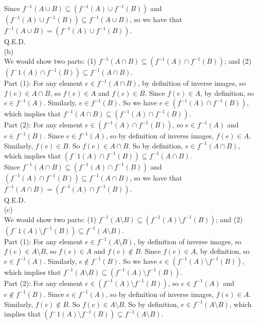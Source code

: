 \documentclass{article}
\begin{document}
\indent Since $f^{-1}(A\cup B)\subseteq(f^{-1}(A)\cup f^{-1}(B))$ and $(f^{-1}(A)\cup f^{-1}(B))\subseteq f^{-1}(A\cup B)$, so we have that $f^{-1}(A\cup B) = (f^{-1}(A)\cup f^{-1}(B))$.\\[.15cm]
\indent Q.E.D.\\[.3cm]
(b) \\[.15cm]
\indent We would show two parts: (1) $f^{-1}(A\cap B)\subseteq(f^{-1}(A)\cap f^{-1}(B))$; and (2) $(f^-1(A)\cap f^{-1}(B))\subseteq f^{-1}(A\cap B)$.\\[.1cm]
\indent Part (1): For any element $e\in f^{-1}(A\cap B)$, by definition of inverse images, so $f(e)\in A\cap B$, so $f(e)\in A$ and $f(e)\in B$. Since $f(e)\in A$, by definition, so $e\in f^{-1}(A)$. Similarly, $e\in f^{-1}(B)$. So we have $e\in (f^{-1}(A)\cap f^{-1}(B))$, which implies that $f^{-1}(A\cap B)\subseteq(f^{-1}(A)\cap f^{-1}(B))$.\\[.1cm]
\indent Part (2): For any element $e\in (f^{-1}(A)\cap f^{-1}(B))$, so $e\in f^{-1}(A)$ and $e\in f^{-1}(B)$. Since $e\in f^{-1}(A)$, so by definition of inverse images, $f(e)\in A$. Similarly, $f(e)\in B$. So $f(e)\in A\cap B$. So by definition, $e\in f^{-1}(A\cap B)$, which implies that $(f^-1(A)\cap f^{-1}(B))\subseteq f^{-1}(A\cap B)$.\\[.1cm]
\indent Since $f^{-1}(A\cap B)\subseteq(f^{-1}(A)\cap f^{-1}(B))$ and $(f^{-1}(A)\cap f^{-1}(B))\subseteq f^{-1}(A\cap B)$, so we have that $f^{-1}(A\cap B) = (f^{-1}(A)\cap f^{-1}(B))$.\\[.15cm]
\indent Q.E.D.\\[.3cm]
(c)\\[.15cm]
\indent We would show two parts: (1) $f^{-1}(A\setminus B)\subseteq(f^{-1}(A)\setminus f^{-1}(B))$; and (2) $(f^-1(A)\setminus f^{-1}(B))\subseteq f^{-1}(A\setminus B)$.\\[.1cm]
\indent Part (1): For any element $e\in f^{-1}(A\setminus B)$, by definition of inverse images, so $f(e)\in A\setminus B$, so $f(e)\in A$ and $f(e)\notin B$. Since $f(e)\in A$, by definition, so $e\in f^{-1}(A)$. Similarly, $e\notin f^{-1}(B)$. So we have $e\in (f^{-1}(A)\setminus f^{-1}(B))$, which implies that $f^{-1}(A\setminus B)\subseteq(f^{-1}(A)\setminus f^{-1}(B))$.\\[.1cm]
\indent Part (2): For any element $e\in (f^{-1}(A)\setminus f^{-1}(B))$, so $e\in f^{-1}(A)$ and $e\notin f^{-1}(B)$. Since $e\in f^{-1}(A)$, so by definition of inverse images, $f(e)\in A$. Similarly, $f(e)\notin B$. So $f(e)\in A\setminus B$. So by definition, $e\in f^{-1}(A\setminus B)$, which implies that $(f^-1(A)\setminus f^{-1}(B))\subseteq f^{-1}(A\setminus B)$.\\[.1cm]
\end{document}

